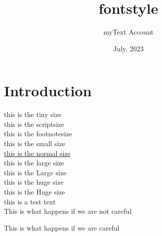 \documentclass{article}
\title{fontstyle}
\author{myText Account}
\date{July, 2023}
\begin{document}
\maketitle
\section{Introduction}
\lipsum[7]

\vspace{2 in} %

\clearpage %

\noindent \tiny this is the tiny size \\
\scriptsize this is the scriptsize \\
\footnotesize this is the footnotesize \\
\small this is the small size \\
\underline{\normalsize this is the normal size} \\
\large this is the large size \\
\Large this is the Large size \\
\huge this is the huge size \\
\Huge this is the Huge size \\ %

{\tiny this is a test text} \\ %
This is what happens if we are not careful

\normalsize This is what happens if we are careful
\end{document}
